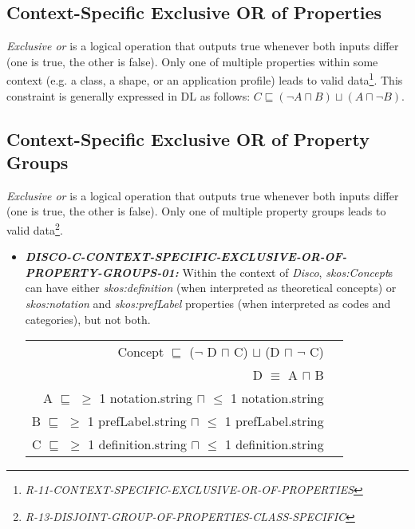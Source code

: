 \documentclass{llncs}
\newcommand{\ms}[1]{\texttt{#1}}
\newenvironment{DL}{
  \vspace{0cm}
  \begin{tabular}{r l}

}{
  \end{tabular}
}
\begin{document}
\subsection{Context-Specific Exclusive OR of Properties}		

\emph{Exclusive or} is a logical operation that outputs true whenever both inputs differ (one is true, the other is false).
Only one of multiple properties within some context (e.g. a class, a shape, or an  application profile) leads to valid data\footnote{\emph{R-11-CONTEXT-SPECIFIC-EXCLUSIVE-OR-OF-PROPERTIES}}.
This constraint is generally expressed in DL as follows: \ms{$C \sqsubseteq (\neg A \sqcap B) \sqcup (A \sqcap \neg B)$}.

\subsection{Context-Specific Exclusive OR of Property Groups}

\emph{Exclusive or} is a logical operation that outputs true whenever both inputs differ (one is true, the other is false).
Only one of multiple property groups leads to valid data\footnote{{\em R-13-DISJOINT-GROUP-OF-PROPERTIES-CLASS-SPECIFIC}}.

\begin{itemize}
	\item \textbf{{\em DISCO-C-CONTEXT-SPECIFIC-EXCLUSIVE-OR-OF-PROPERTY-GROUPS-01:}}
Within the context of \emph{Disco}, \emph{skos:Concept}s can have either \emph{skos:definition} (when interpreted as theoretical concepts) or \emph{skos:notation} and \emph{skos:prefLabel} properties (when interpreted as codes and categories), but not both.

\begin{DL}
Concept $\sqsubseteq$ ($\neg$ D $\sqcap$ C) $\sqcup$ (D $\sqcap$ $\neg$ C) \\ 
D $\equiv$ A $\sqcap$ B \\
A $\sqsubseteq$ $\geq$ 1 notation.string $\sqcap$ $\leq$ 1 notation.string \\
B $\sqsubseteq$ $\geq$ 1 prefLabel.string $\sqcap$ $\leq$ 1 prefLabel.string \\
C $\sqsubseteq$ $\geq$ 1 definition.string $\sqcap$ $\leq$ 1 definition.string \\
\end{DL}
\end{itemize}
\end{document}
